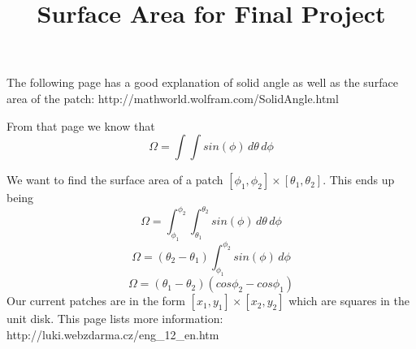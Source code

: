 \documentclass[11pt,psfig]{article}
\begin{document}
\setlength{\parskip}{1.2ex plus0.3ex minus 0.3ex}

\title{Surface Area for Final Project}
\maketitle
The following page has a good explanation of solid angle as well as the surface area of the patch:
http://mathworld.wolfram.com/SolidAngle.html

From that page we know that
\[
\Omega = \int{ \int{ sin(\phi) \,d\theta \,d\phi }}
\]

We want to find the surface area of a patch $[\phi_1,\phi_2] \times [\theta_1,\theta_2]$. This ends up being
\[
\Omega = \int_{\phi_1}^{\phi_2}{ \int_{\theta_1}^{\theta_2}{ sin(\phi) \,d\theta \,d\phi }}
\]
\[
\Omega = (\theta_2 - \theta_1)\int_{\phi_1}^{\phi_2}{  sin(\phi) \,d\phi }
\]
\[
\Omega = (\theta_1 - \theta_2)(cos\phi_2 - cos\phi_1)
\]
Our current patches are in the form $[x_1,y_1] \times [x_2,y_2]$ which are squares in the unit disk. This page lists more information:
http://luki.webzdarma.cz/eng\_12\_en.htm
\end{document}
